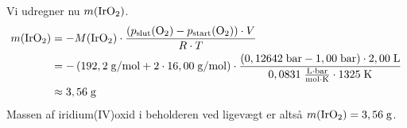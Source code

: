 \documentclass{report}
\begin{document}
Vi udregner nu $m(\ce{IrO2} )$.
\begin{equation*}
\begin{split}
  m(\ce{IrO2} ) &= -M(\ce{IrO2} ) \cdot \frac{(p_{\text{slut} }(\ce{O2})-p_{\text{start}}(\ce{O2} )) \cdot V}{R \cdot T} \\
  &=-\left(192,2 \;\unit{g/mol} + 2 \cdot 16,00 \;\unit{g/mol} \right) \cdot \frac{(0,12642 \;\unit{bar} -1,00 \;\unit{bar} ) \cdot 2,00 \;\unit{L} }{0,0831 \;\unit{\frac{L \cdot bar}{mol \cdot K}} \cdot 1325 \;\unit{K}}\\
  &\approx 3,56 \;\unit{g} 
\end{split}
\end{equation*}
Massen af iridium(IV)oxid i beholderen ved ligevægt er altså $m(\ce{IrO2} )=3,56 \;\unit{g} $.
\end{document}
